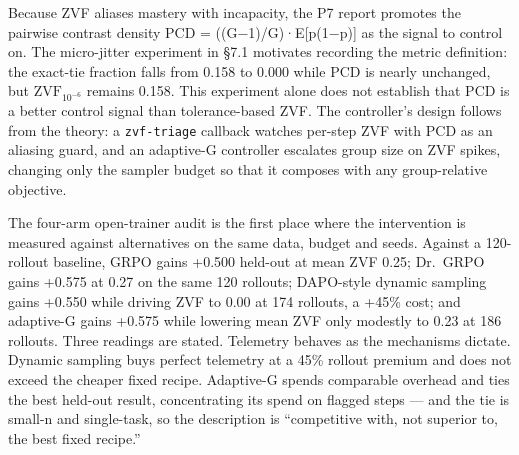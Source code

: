 \documentclass[12pt,a4paper]{report}
\begin{document}
Because ZVF aliases mastery with incapacity, the P7 report promotes the
pairwise contrast density PCD = ((G−1)/G)·E{[}p(1−p){]} as the signal to
control on. The micro-jitter experiment in §7.1 motivates recording the
metric definition: the exact-tie fraction falls from 0.158 to 0.000
while PCD is nearly unchanged, but \(\mathrm{ZVF}_{10^{-6}}\) remains
0.158. This experiment alone does not establish that PCD is a better
control signal than tolerance-based ZVF. The controller's design follows
from the theory: a \texttt{zvf-triage} callback watches per-step ZVF
with PCD as an aliasing guard, and an adaptive-G controller escalates
group size on ZVF spikes, changing only the sampler budget so that it
composes with any group-relative objective.

The four-arm open-trainer audit is the first place where the
intervention is measured against alternatives on the same data, budget
and seeds. Against a 120-rollout baseline, GRPO gains +0.500 held-out at
mean ZVF 0.25; Dr.~GRPO gains +0.575 at 0.27 on the same 120 rollouts;
DAPO-style dynamic sampling gains +0.550 while driving ZVF to 0.00 at
174 rollouts, a +45\% cost; and adaptive-G gains +0.575 while lowering
mean ZVF only modestly to 0.23 at 186 rollouts. Three readings are
stated. Telemetry behaves as the mechanisms dictate. Dynamic sampling
buys perfect telemetry at a 45\% rollout premium and does not exceed the
cheaper fixed recipe. Adaptive-G spends comparable overhead and ties the
best held-out result, concentrating its spend on flagged steps --- and
the tie is small-n and single-task, so the description is ``competitive
with, not superior to, the best fixed recipe.''
\end{document}
